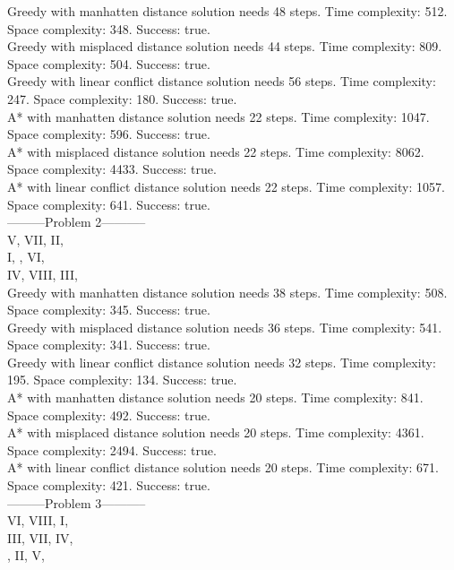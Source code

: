 \documentclass[paper=a4, fontsize=11pt]{scrartcl} %
\numberwithin{equation}{section} %
\numberwithin{figure}{section} %
\numberwithin{table}{section} %
\begin{document}
Greedy with manhatten distance solution needs 48 steps. Time complexity: 512. Space complexity: 348. Success: true.\\ 
Greedy with misplaced distance solution needs 44 steps. Time complexity: 809. Space complexity: 504. Success: true.\\ 
Greedy with linear conflict distance solution needs 56 steps. Time complexity: 247. Space complexity: 180. Success: true.\\ 
A* with manhatten distance solution needs 22 steps. Time complexity: 1047. Space complexity: 596. Success: true.\\ 
A* with misplaced distance solution needs 22 steps. Time complexity: 8062. Space complexity: 4433. Success: true.\\ 
A* with linear conflict distance solution needs 22 steps. Time complexity: 1057. Space complexity: 641. Success: true.\\ 
---------Problem 2-----------\\ 
V, VII, II, \\ 
I, , VI, \\ 
IV, VIII, III, \\ 

Greedy with manhatten distance solution needs 38 steps. Time complexity: 508. Space complexity: 345. Success: true.\\ 
Greedy with misplaced distance solution needs 36 steps. Time complexity: 541. Space complexity: 341. Success: true.\\ 
Greedy with linear conflict distance solution needs 32 steps. Time complexity: 195. Space complexity: 134. Success: true.\\ 
A* with manhatten distance solution needs 20 steps. Time complexity: 841. Space complexity: 492. Success: true.\\ 
A* with misplaced distance solution needs 20 steps. Time complexity: 4361. Space complexity: 2494. Success: true.\\ 
A* with linear conflict distance solution needs 20 steps. Time complexity: 671. Space complexity: 421. Success: true.\\ 
---------Problem 3-----------\\ 
VI, VIII, I, \\ 
III, VII, IV, \\ 
, II, V, \\ 
\end{document}
